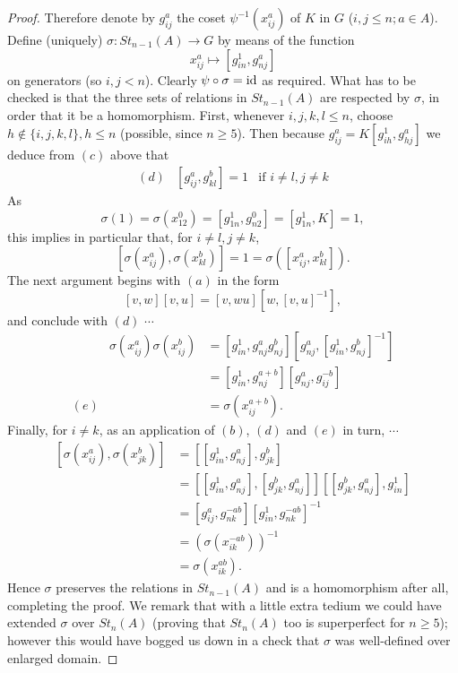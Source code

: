 \begin{proof}
Therefore denote by $g_{ij}^a$ the coset $\psi^{-1}(x_{ij}^a)$ of $K$ in $G$ ($i,j\leqslant n; a\in A$). Define (uniquely) $\sigma\colon   St_{n-1}(A)\rightarrow G$ by means of the function
\[x_{ij}^a \mapsto [g_{in}^1,g_{nj}^a]\]
on generators (so $i,j<n$). Clearly $\psi \circ \sigma =\mathrm{id}$ as required. What has to be checked is that the three sets of relations in $St_{n-1}(A)$ are respected by $\sigma$, in order that it be a homomorphism. First, whenever $i,j,k,l\leqslant n$, choose $h\notin \{i,j,k,l\}, h\leqslant n$ (possible, since $n\geqslant 5$). Then because $g_{ij}^a=K[g_{ih}^1,g_{hj}^a]$ we deduce from $(c)$ above that 
\begin{equation*}
\begin{array}{rcr}
(d) &[g_{ij}^a,g_{kl}^b]=1 & \text{if } i\neq l, j\neq k
\end{array}
\end{equation*}
As
\[\sigma(1)=\sigma(x_{12}^0)=[g_{1n}^1,g_{n2}^0]=[g_{1n}^1,K]=1,\]
this implies in particular that, for $i\neq l, j\neq k$,
\[[\sigma(x_{ij}^a),\sigma(x_{kl}^b)]=1=\sigma([x_{ij}^a,x_{kl}^b]).\]
The next argument begins with $(a)$ in the form
\[[v,w][v,u]=[v,wu][w,[v,u]^{-1}],\]
and conclude with $(d)$ $\cdots$
\begin{equation*}
\begin{array}{rrl}
 &\sigma(x_{ij}^a)\sigma(x_{ij}^b)&=[g_{in}^1,g_{nj}^ag_{nj}^b][g_{nj}^a,[g_{in}^1,g_{nj}^b]^{-1}] \\
 & &=[g_{in}^1,g_{nj}^{a+b}][g_{nj}^a,g_{ij}^{-b}]\\
 (e)& &=\sigma(x_{ij}^{a+b}). 
\end{array}
\end{equation*}
Finally, for $i\neq k$, as an application of $(b)$, $(d)$ and $(e)$ in turn, $\cdots$
\begin{equation*}
\begin{array}{rl}
[\sigma(x_{ij}^a),\sigma(x_{jk}^b)] & =[[g_{in}^1,g_{nj}^a],g_{jk}^b]\\
& =[[g_{in}^1,g_{nj}^a],[g_{jk}^b,g_{nj}^a]][[g_{jk}^b,g_{nj}^a],g_{in}^1]\\
& =[g_{ij}^a,g_{nk}^{-ab}][g_{in}^1,g_{nk}^{-ab}]^{-1}\\
& =(\sigma(x_{ik}^{-ab}))^{-1}\\
& =\sigma(x_{ik}^{ab}).
\end{array}
\end{equation*}
Hence $\sigma$ preserves the relations in $St_{n-1}(A)$ and is a homomorphism after all, completing the proof. We remark that with a little extra tedium we could have extended $\sigma$ over $St_n(A)$ (proving that $St_n(A)$ too is superperfect for $n\geqslant 5$); however this would have bogged us down in a check that $\sigma$ was well-defined over enlarged domain.
\end{proof}
